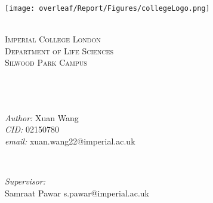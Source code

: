 
\begin{titlepage} %
    
    \texttt{[image: overleaf/Report/Figures/collegeLogo.png]} %
     
    
    \center %
    

    \quad\\[1cm]
    \textsc{\Large Imperial College London}\\[0.5cm] %
    \textsc{\Large Department of Life Sciences}\\[0.5cm]
    \textsc{\Large Silwood Park Campus}\\[1cm] %
     
    \makeatletter
    \HRule \\[0.4cm]
    { \huge \bfseries \@title}\\[0.4cm] %
    \HRule \\[1cm]
     
    \begin{minipage}{0.5\textwidth}
    \begin{flushleft} \large
    \emph{Author:} Xuan Wang \\
    \emph{CID:} 02150780\\
    \emph{email:} xuan.wang22@imperial.ac.uk
    \end{flushleft}
    \end{minipage}
    ~
    \begin{minipage}{0.4\textwidth}
    \begin{flushright} \large
    \emph{Supervisor:} \\
    Samraat Pawar
    s.pawar@imperial.ac.uk\\[1.2em]
    \end{flushright}
    \end{minipage}\\[2.5cm]
    \makeatother
    

\end{titlepage}
